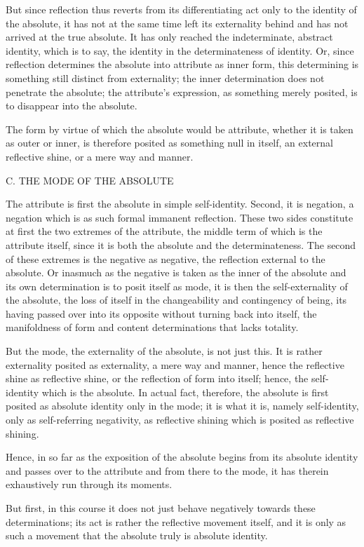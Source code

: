 But since reflection thus reverts
from its differentiating act
only to the identity of the absolute,
it has not at the same time left its externality behind
and has not arrived at the true absolute.
It has only reached the indeterminate, abstract identity,
which is to say, the identity in the determinateness of identity.
Or, since reflection determines the absolute into attribute as inner form,
this determining is something still distinct from externality;
the inner determination does not penetrate the absolute;
the attribute's expression, as something merely posited,
is to disappear into the absolute.

The form by virtue of which the absolute would be attribute,
whether it is taken as outer or inner,
is therefore posited as something null in itself,
an external reflective shine, or a mere way and manner.

C. THE MODE OF THE ABSOLUTE

The attribute is first the absolute in simple self-identity.
Second, it is negation, a negation which is as such
formal immanent reflection.
These two sides constitute at first the two extremes of the attribute,
the middle term of which is the attribute itself,
since it is both the absolute and the determinateness.
The second of these extremes is the negative as negative,
the reflection external to the absolute.
Or inasmuch as the negative is taken as the inner of the absolute
and its own determination is to posit itself as mode,
it is then the self-externality of the absolute,
the loss of itself in the changeability and contingency of being,
its having passed over into its opposite without turning back into itself,
the manifoldness of form and content determinations that lacks totality.

But the mode, the externality of the absolute, is not just this.
It is rather externality posited as externality,
a mere way and manner,
hence the reflective shine as reflective shine,
or the reflection of form into itself;
hence, the self-identity which is the absolute.
In actual fact, therefore, the absolute is first posited
as absolute identity only in the mode;
it is what it is, namely self-identity,
only as self-referring negativity,
as reflective shining which is posited as reflective shining.

Hence, in so far as the exposition of the absolute
begins from its absolute identity
and passes over to the attribute
and from there to the mode,
it has therein exhaustively run through its moments.

But first, in this course it does not just behave
negatively towards these determinations;
its act is rather the reflective movement itself,
and it is only as such a movement that
the absolute truly is absolute identity.

